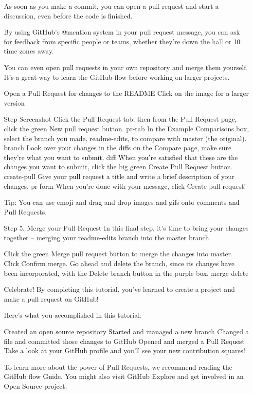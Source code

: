 As soon as you make a commit, you can open a pull request and start a discussion, even before the code is finished.

By using GitHub’s @mention system in your pull request message, you can ask for feedback from specific people or teams, whether they’re down the hall or 10 time zones away.

You can even open pull requests in your own repository and merge them yourself. It’s a great way to learn the GitHub flow before working on larger projects.

Open a Pull Request for changes to the README
Click on the image for a larger version

Step	Screenshot
Click the  Pull Request tab, then from the Pull Request page, click the green New pull request button.	pr-tab
In the Example Comparisons box, select the branch you made, readme-edits, to compare with master (the original).	branch
Look over your changes in the diffs on the Compare page, make sure they’re what you want to submit.	diff
When you’re satisfied that these are the changes you want to submit, click the big green Create Pull Request button.	create-pull
Give your pull request a title and write a brief description of your changes.	pr-form
When you’re done with your message, click Create pull request!

Tip: You can use emoji and drag and drop images and gifs onto comments and Pull Requests.


Step 5. Merge your Pull Request
In this final step, it’s time to bring your changes together – merging your readme-edits branch into the master branch.

Click the green Merge pull request button to merge the changes into master.
Click Confirm merge.
Go ahead and delete the branch, since its changes have been incorporated, with the Delete branch button in the purple box.
merge delete

Celebrate!
By completing this tutorial, you’ve learned to create a project and make a pull request on GitHub!

Here’s what you accomplished in this tutorial:

Created an open source repository
Started and managed a new branch
Changed a file and committed those changes to GitHub
Opened and merged a Pull Request
Take a look at your GitHub profile and you’ll see your new contribution squares!

To learn more about the power of Pull Requests, we recommend reading the GitHub flow Guide. You might also visit GitHub Explore and get involved in an Open Source project.